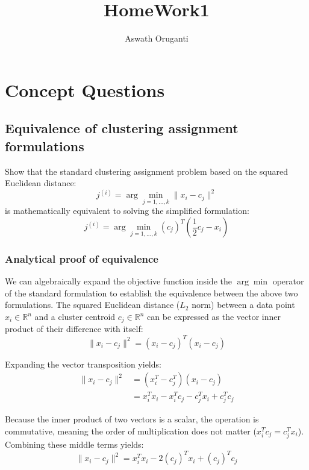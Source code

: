 \documentclass[twoside, 10pt]{article}
\begin{document}
\title{\textbf{\Large HomeWork1}}
\author{Aswath Oruganti}
\maketitle

\section{Concept Questions}


\subsection{Equivalence of clustering assignment formulations}
Show that the standard clustering assignment problem based on the squared Euclidean distance:
\begin{equation}
j^{(i)} = \arg\min_{j=1, \dots, k} \|x_i - c_j\|^2
\end{equation}
is mathematically equivalent to solving the simplified formulation:
\begin{equation}
j^{(i)} = \arg\min_{j=1, \dots, k} (c_j)^T \left( \frac{1}{2}c_j - x_i \right)
\end{equation}

\subsubsection{Analytical proof of equivalence} %

We can algebraically expand the objective function inside the $\arg\min$ operator of the standard formulation to establish the equivalence between the above two formulations. 
The squared Euclidean distance ($L_2$ norm) between a data point $x_i \in \mathbb{R}^n$ and a cluster centroid $c_j \in \mathbb{R}^n$ can be expressed as the vector inner product of their difference with itself:
\begin{equation}
\|x_i - c_j\|^2 = (x_i - c_j)^T (x_i - c_j)
\end{equation}

Expanding the vector transposition yields:
\begin{align}
\|x_i - c_j\|^2 &= (x_i^T - c_j^T)(x_i - c_j) \nonumber \\
&= x_i^T x_i - x_i^T c_j - c_j^T x_i + c_j^T c_j
\end{align}

Because the inner product of two vectors is a scalar, the operation is commutative, meaning the order of multiplication does not matter ($x_i^T c_j = c_j^T x_i$). Combining these middle terms yields:
\begin{equation}
\|x_i - c_j\|^2 = x_i^T x_i - 2(c_j)^T x_i + (c_j)^T c_j
\end{equation}
\end{document}
